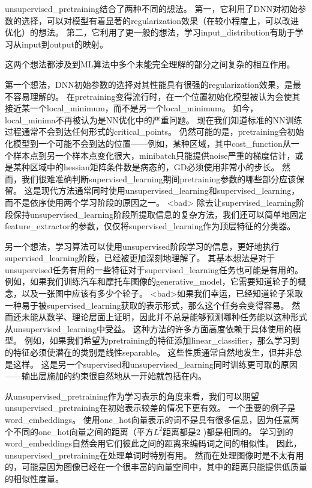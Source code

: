 \gls{unsupervised_pretraining}结合了两种不同的想法。
第一，它利用了\gls{DNN}对初始参数的选择，可以对模型有着显著的\gls{regularization}效果（在较小程度上，可以改进优化）的想法。
第二，它利用了更一般的想法，学习\gls{input_distribution}有助于学习从\gls{input}到\gls{output}的映射。


这两个想法都涉及到\gls{ML}算法中多个未能完全理解的部分之间复杂的相互作用。


第一个想法，\gls{DNN}初始参数的选择对其性能具有很强的\gls{regularization}效果，是最不容易理解的。
在\gls{pretraining}变得流行时，在一个位置初始化模型被认为会使其接近某一个\gls{local_minimum}，而不是另一个\gls{local_minimum}。
如今，\gls{local_minima}不再被认为是\gls{NN}优化中的严重问题。
现在我们知道标准的\gls{NN}训练过程通常不会到达任何形式的\gls{critical_points}。
仍然可能的是，\gls{pretraining}会初始化模型到一个可能不会到达的位置——例如，某种区域，其中\gls{cost_function}从一个样本点到另一个样本点变化很大，\gls{minibatch}只能提供\gls{noise}严重的梯度估计，或是某种区域中的\gls{hessian}矩阵条件数是病态的，\gls{GD}必须使用非常小的步长。
然而，我们很难准确判断\gls{supervised_learning}期间\gls{pretraining}参数的哪些部分应该保留。
这是现代方法通常同时使用\gls{unsupervised_learning}和\gls{supervised_learning}，而不是依序使用两个学习阶段的原因之一。
<bad> 除去让\gls{supervised_learning}阶段保持\gls{unsupervised_learning}阶段所提取信息的复杂方法，我们还可以简单地固定\gls{feature_extractor}的参数，仅仅将\gls{supervised_learning}作为顶层特征的分类器。


另一个想法，学习算法可以使用\gls{unsupervised}阶段学习的信息，更好地执行\gls{supervised_learning}阶段，已经被更加深刻地理解了。
其基本想法是对于\gls{unsupervised}任务有用的一些特征对于\gls{supervised_learning}任务也可能是有用的。
例如，如果我们训练汽车和摩托车图像的\gls{generative_model}，它需要知道轮子的概念，以及一张图中应该有多少个轮子。
<bad>如果我们幸运，已经知道轮子采取一种易于被\gls{supervised_learning}获取的表示形式，那么这个任务会变得容易。
然而还未能从数学、理论层面上证明，因此并不总是能够预测哪种任务能以这种形式从\gls{unsupervised_learning}中受益。
这种方法的许多方面高度依赖于具体使用的模型。
例如，如果我们希望为\gls{pretraining}的特征添加\gls{linear_classifier}，那么学习到的特征必须使潜在的类别是线性\gls{separable}。
这些性质通常自然地发生，但并非总是这样。
这是另一个\gls{supervised}和\gls{unsupervised_learning}同时训练更可取的原因——输出层施加的约束很自然地从一开始就包括在内。


从\gls{unsupervised_pretraining}作为学习表示的角度来看，我们可以期望\gls{unsupervised_pretraining}在初始表示较差的情况下更有效。
一个重要的例子是\gls{word_embeddings}。
使用\gls{one_hot}向量表示的词不是具有很多信息，因为任意两个不同的\gls{one_hot}向量之间的距离（平方$L^2$距离都是$2$ )都是相同的。
学习到的\gls{word_embeddings}自然会用它们彼此之间的距离来编码词之间的相似性。
因此，\gls{unsupervised_pretraining}在处理单词时特别有用。
然而在处理图像时是不太有用的，可能是因为图像已经在一个很丰富的向量空间中，其中的距离只能提供低质量的相似性度量。


